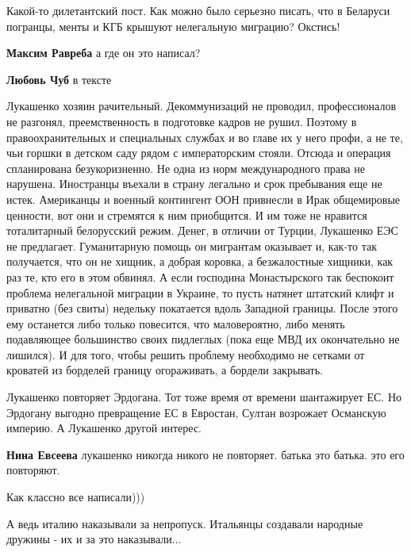 \begin{itemize}
Какой-то дилетантский пост. Как можно было серьезно писать, что в Беларуси
погранцы, менты и КГБ крышуют нелегальную миграцию? Окстись!

\begin{itemize} %
\textbf{Максим Равреба} а где он это написал?

\textbf{Любовь Чуб} в тексте
\end{itemize} %


Лукашенко хозяин рачительный. Декоммунизаций не проводил, профессионалов не
разгонял, преемственность в подготовке кадров не рушил. Поэтому в
правоохранительных и специальных службах и во главе их у него профи, а не те,
чьи горшки в детском саду рядом с императорским стояли. Отсюда и операция
спланирована безукоризненно. Не одна из норм международного права не нарушена.
Иностранцы въехали в страну легально и срок пребывания еще не истек. Американцы
и военный контингент ООН привнесли в Ирак общемировые ценности, вот они и
стремятся к ним приобщится. И им тоже не нравится тоталитарный белорусский
режим. Денег, в отличии от Турции, Лукашенко ЕЭС не предлагает. Гуманитарную
помощь он мигрантам оказывает и, как-то так получается, что он не хищник, а
добрая коровка, а безжалостные хищники, как раз те, кто его в этом обвинял. А
если господина Монастырского так беспокоит проблема нелегальной миграции в
Украине, то пусть натянет штатский клифт и приватно (без свиты) недельку
покатается вдоль Западной границы. После этого ему останется либо только
повесится, что маловероятно, либо менять подавляющее большинство своих
пидлеглых (пока еще МВД их окончательно не лишился). И для того, чтобы решить
проблему необходимо не сетками от кроватей из борделей границу огораживать, а
бордели закрывать.


Лукашенко повторяет Эрдогана. Тот тоже время от времени шантажирует ЕС. Но
Эрдогану выгодно превращение ЕС в Евростан, Султан возрожает Османскую империю.
А Лукашенко другой интерес.

\begin{itemize} %
\textbf{Нина Евсеева} лукашенко никогда никого не повторяет. батька это батька. это его повторяют.
\end{itemize} %

Как классно все написали)))

А ведь италию наказывали за непропуск. Итальянцы создавали народные дружины - их и за это наказывали...


\end{itemize}

